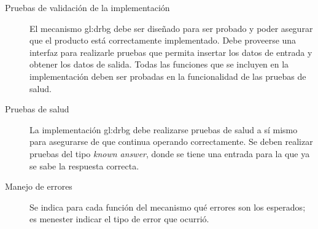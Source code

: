 \begin{description}
  \item[Pruebas de validación de la implementación] El mecanismo \gls{gl:drbg}
    debe ser diseñado para ser probado y poder asegurar que el producto está
    correctamente implementado. Debe proveerse una interfaz para realizarle
    pruebas que permita insertar los datos de entrada y obtener los datos de
    salida. Todas las funciones que se incluyen en la implementación deben ser
    probadas en la funcionalidad de las pruebas de salud.

  \item[Pruebas de salud] La implementación \gls{gl:drbg} debe realizarse
    pruebas de salud a sí mismo para asegurarse de que continua operando
    correctamente. Se deben realizar pruebas del tipo \textit{known answer},
    donde se tiene una entrada para la que ya se sabe la respuesta correcta.
  
  \item[Manejo de errores] Se indica para cada función del mecanismo qué errores
    son los esperados; es menester indicar el tipo de error que ocurrió. 

\end{description}
